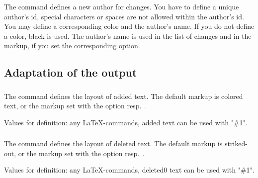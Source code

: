 \subsubsection{}

The command  defines a new author for changes.
You have to define a unique author's id, special characters or spaces are not allowed within the author's id.
You may define a corresponding color and the author's name.
If you do not define a color, black is used.
The author's name is used in the list of changes and in the markup, if you set the corresponding option.




\subsection{Adaptation of the output}
\label{sec:user:customizingoutput}


\subsubsection{}
\DescribeMacro{\setaddedmarkup}

The command  defines the layout of added text.
The default markup is colored text, or the markup set with the option  resp.\ .

Values for definition: any \LaTeX-commands, added text can be used with "\#1".




\subsubsection{}
\DescribeMacro{\setdeletedmarkup}

The command  defines the layout of deleted text.
The default markup is striked-out, or the markup set with the option  resp.\ .

Values for definition: any \LaTeX-commands, deleted0 text can be used with "\#1".




